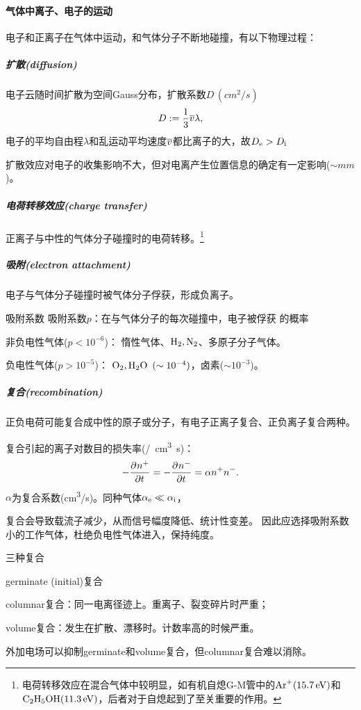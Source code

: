\paragraph{气体中离子、电子的运动}
电子和正离子在气体中运动，和气体分子不断地碰撞，有以下物理过程：
\subparagraph{扩散(diffusion)}
电子云随时间扩散为空间Gauss分布，扩散系数$D\,(\si{cm^2/s})$
\[
	D:=\frac13\overline{v}\lambda,
\]
电子的平均自由程$\lambda$和乱运动平均速度$\overline{v}$都比离子的大，故$D_\mathrm e>D_{\mathrm{i}}$

扩散效应对电子的收集影响不大，但对电离产生位置信息的确定有一定影响($\sim\si{mm}$)。
\subparagraph{电荷转移效应(charge transfer)}
正离子与中性的气体分子碰撞时的电荷转移。\footnote{电荷转移效应在混合气体中较明显，如有机自熄G-M管中的$\mathrm{Ar}^+(\SI{15.7}{eV})$和$\mathrm{C_2H_5OH}(\SI{11.3}{eV})$，后者对于自熄起到了至关重要的作用。}

\subparagraph{吸附(electron attachment)}
电子与气体分子碰撞时被气体分子俘获，形成负离子。
\begin{definition}{吸附系数}{}
	吸附系数$p$：在与气体分子的每次碰撞中，电子被俘获%
	的概率%
	\begin{compactitem}
		\item 非负电性气体($p<10^{-6}$)：
		惰性气体、$\mathrm{H}_2,\mathrm{N}_2$、多原子分子气体。
		\item 负电性气体($p>10^{-5}$)：
		$\mathrm{O_2,H_2O}\enspace (\sim 10^{-4})$，卤素($\sim 10^{-3}$)。
	\end{compactitem}
\end{definition}
\subparagraph{复合(recombination)}
正负电荷可能复合成中性的原子或分子，有电子正离子复合、正负离子复合两种。

复合引起的离子对数目的损失率(\si{/cm^3.s})：
\[
	-\frac{\partial^{{}}n^+}{\partial{t}^{{}}}=-\frac{\partial^{{}}n^-}{\partial{t}^{{}}}=\alpha n^+n^-.
\]
$\alpha$为复合系数(\si{cm^3/s})。同种气体$\alpha_\mathrm e\ll\alpha_{\mathrm{i}}$，

复合会导致载流子减少，从而信号幅度降低、统计性变差。%
因此应选择吸附系数小的工作气体，杜绝负电性气体进入，保持纯度。
\begin{definition}{三种复合}{}
	\begin{compactitem}
		\item germinate (initial)复合
		\item columnar复合：同一电离径迹上。重离子、裂变碎片时严重；
		\item volume复合：发生在扩散、漂移时。计数率高的时候严重。
	\end{compactitem}
\end{definition}
\noindent
外加电场可以抑制germinate和volume复合，但columnar复合难以消除。

